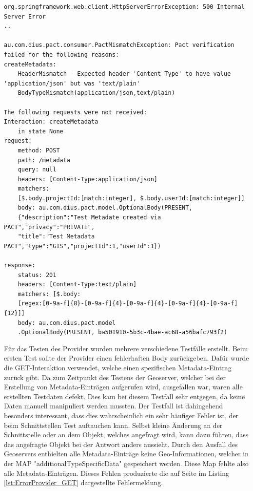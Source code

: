 \documentclass{llncs}
\begin{document}
\begin{lstlisting}[caption=Fehler im Header,label={lst:ErrorHeaderConsumer}]
org.springframework.web.client.HttpServerErrorException: 500 Internal Server Error
..

au.com.dius.pact.consumer.PactMismatchException: Pact verification failed for the following reasons:
createMetadata:
    HeaderMismatch - Expected header 'Content-Type' to have value 'application/json' but was 'text/plain'
    BodyTypeMismatch(application/json,text/plain)

The following requests were not received:
Interaction: createMetadata
	in state None
request:
	method: POST
	path: /metadata
	query: null
	headers: [Content-Type:application/json]
	matchers: 
	[$.body.projectId:[match:integer], $.body.userId:[match:integer]]
	body: au.com.dius.pact.model.OptionalBody(PRESENT, 
	{"description":"Test Metadate created via PACT","privacy":"PRIVATE",
	"title":"Test Metadata PACT","type":"GIS","projectId":1,"userId":1})

response:
	status: 201 
	headers: [Content-Type:text/plain] 
	matchers: [$.body:
	[regex:[0-9a-f]{8}-[0-9a-f]{4}-[0-9a-f]{4}-[0-9a-f]{4}-[0-9a-f]{12}]] 
	body: au.com.dius.pact.model
	.OptionalBody(PRESENT, ba501910-5b3c-4bae-ac68-a56bafc793f2)
\end{lstlisting}

Für das Testen des Provider wurden mehrere verschiedene Testfälle erstellt. Beim ersten Test sollte der Provider einen fehlerhaften Body zurückgeben. Dafür wurde die GET-Interaktion verwendet, welche einen spezifischen Metadata-Eintrag zurück gibt. Da zum Zeitpunkt des Testens der Geoserver, welcher bei der Erstellung von Metadata-Einträgen aufgerufen wird,  ausgefallen war, waren alle erstellten Testdaten defekt. Dies kam bei diesem Testfall sehr entgegen, da keine Daten manuell manipuliert werden mussten. Der Testfall ist dahingehend besonders interessant, dass dies wahrscheinlich ein sehr häufiger Fehler ist, der beim Schnittstellen Test auftauchen kann. Selbst kleine Änderung an der Schnittstelle oder an dem Objekt, welches angefragt wird, kann dazu führen, dass das angefragte Objekt bei der Antwort anders aussieht. 
Durch den Ausfall des Geoservers enthielten alle Metadata-Einträge keine Geo-Informationen, welcher in der MAP "additionalTypeSpecificData" gespeichert werden. Diese Map fehlte also alle Metadata-Einträgen. Dieses Fehlen produzierte die auf Seite \pageref{lst:ErrorProvider_GET} im Listing \ref{lst:ErrorProvider_GET} dargestellte Fehlermeldung.
\end{document}
